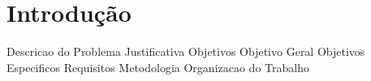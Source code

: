 \chapter*[Introdução]{Introdução}

Descricao do Problema
Justificativa
Objetivos
Objetivo Geral
Objetivos Especificos
Requisitos
Metodologia
Organizacao do Trabalho
